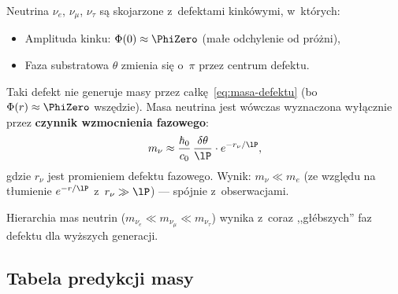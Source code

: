 \begin{proposition}%
\label{prop:neutrinos}
Neutrina $\nu_e$, $\nu_\mu$, $\nu_\tau$ s\k{a} skojarzone
z~defektami kink\'owymi, w~kt\'orych:
\begin{itemize}[nosep]
    \item Amplituda kinku: $\Phi(0) \approx \PhiZero$
          (ma\l{}e odchylenie od pr\'o\.zni),
    \item Faza substratowa $\theta$ zmienia si\k{e} o~$\pi$
          przez centrum defektu.
\end{itemize}
Taki defekt nie generuje masy przez ca\l{}k\k{e}~\eqref{eq:masa-defektu}
(bo $\Phi(r) \approx \PhiZero$ wsz\k{e}dzie).
Masa neutrina jest wówczas wyznaczona wy\l{}\k{a}cznie
przez \textbf{czynnik wzmocnienia fazowego}:
\begin{equation}\label{eq:neutrino-mass}
    m_\nu \approx \frac{\hbar_0}{c_0}\,
    \frac{\delta\theta}{\lP} \cdot e^{-r_{\nu}/\lP},
\end{equation}
gdzie $r_\nu$ jest promieniem defektu fazowego.
Wynik: $m_\nu \ll m_e$ (ze wzgl\k{e}du na t\l{}umienie $e^{-r/\lP}$
z~$r_\nu \gg \lP$) --- sp\'ojnie z~obserwacjami.

Hierarchia mas neutrin ($m_{\nu_e} \ll m_{\nu_\mu} \ll m_{\nu_\tau}$)
wynika z~coraz ,,g\l{}\'ebszych'' faz defektu dla wy\.zszych generacji.
\end{proposition}

\subsection{Tabela predykcji masy}%
\label{app:F-predictions}


